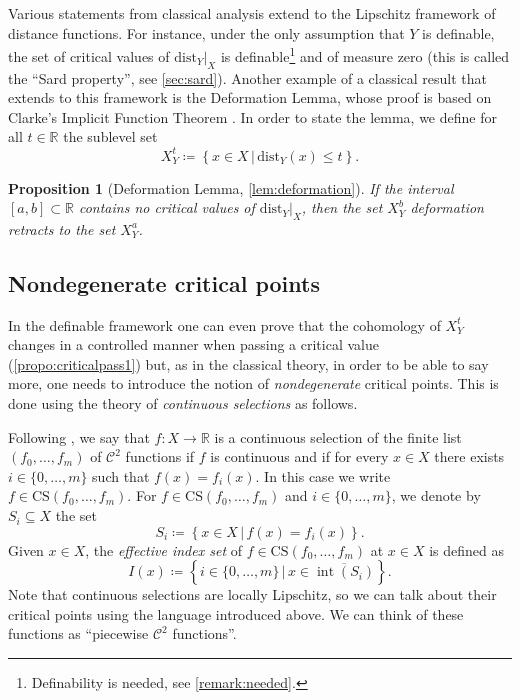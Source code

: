\documentclass{amsart}
\newcommand{\R}{\mathbb{R}}
\newcommand{\dd}{\mathrm{dist}}
\newcommand{\dist}{{\mathrm{dist}_Y|_X}}
\newtheorem{proposition}[subsubsection]{Proposition}
\theoremstyle{definition}
\theoremstyle{remark}
\begin{document}
Various statements from classical analysis extend to the Lipschitz framework of distance functions. For instance, under the only assumption that $Y$ is definable, the set of critical values of $\dist$ is definable\footnote{Definability is needed, see \cref{remark:needed}.} and of measure zero (this is called the ``Sard property'', see \cref{sec:sard}). Another example of a classical result that extends to this framework is the Deformation Lemma, whose proof is based on Clarke's Implicit Function Theorem \cite{Clarke}. In order to state the lemma, we define for all $t \in \R$ the sublevel set
\[
X_Y^t \coloneqq \left\{ x\in X \,\bigg|\, \dd_Y(x)\leq t \right\}.
\]

\begin{proposition}[Deformation Lemma, \cref{lem:deformation}]
If the interval $[a,b] \subset \R$ contains no critical values of $\dist$, then the set $X_Y^b$ deformation retracts to the set $X_Y^a$.
\end{proposition}


\subsection{Nondegenerate critical points} In the definable framework one can even prove that the cohomology of $X_Y^t$ changes in a controlled manner when passing a critical value (\cref{propo:criticalpass1}) but, as in the classical theory, in order to be able to say more, one needs to introduce the notion of \emph{nondegenerate} critical points. This is done using the theory of \emph{continuous selections} as follows.

Following \cite{APS1997}, we say that $f \colon X \to \R$ is a continuous selection of the finite list $(f_0, \ldots, f_m)$ of $\mathcal{C}^2$ functions  if $f$ is continuous and if for every $x \in X$ there exists $i \in \{0, \ldots, m\}$ such that $f(x) = f_i(x)$. In this case we write $f \in \mathrm{CS}(f_0, \ldots, f_m)$. For $f \in \mathrm{CS}(f_0, \ldots, f_m)$ and $i \in \{0, \ldots, m\}$, we denote by $S_i \subseteq X$ the set
\[
S_i \coloneqq \left\{ x\in X \,\bigg|\, f(x) = f_i(x) \right\}.
\]
Given $x \in X$, the \emph{effective index set} of $f\in \mathrm{CS}(f_0, \ldots, f_m)$ at $x\in X$ is defined as
\[
I(x)\coloneqq \left\{ i\in \{0, \ldots, m\} \,\bigg|\, x \in
\overline{\operatorname{int}(S_i)}
\right\}.
\]
Note that continuous selections are locally Lipschitz, so we can talk about their critical points using the language introduced above. We can think of these functions as ``piecewise $\mathcal{C}^2$ functions''.
\end{document}
